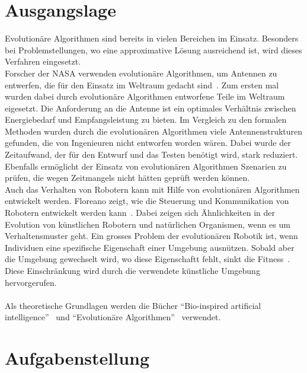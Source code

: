   \section{Ausgangslage}

    Evolutionäre Algorithmen sind bereits in vielen Bereichen im Einsatz.
    Besonders bei Problemstellungen, wo eine approximative Lösung ausreichend ist,
    wird dieses Verfahren eingesetzt.
    \\
    Forscher der NASA verwenden evolutionäre Algorithmen, um Antennen zu entwerfen,
    die für den Einsatz im Weltraum gedacht sind~\cite{Hornby2006}.
    Zum ersten mal wurden dabei durch evolutionäre Algorithmen entworfene Teile im Weltraum eigesetzt.
    Die Anforderung an die Antenne ist ein optimales Verhältnis zwischen Energiebedarf und Empfangsleistung zu bieten.
    Im Vergleich zu den formalen Methoden wurden durch die evolutionären Algorithmen viele Antennenstrukturen gefunden,
    die von Ingenieuren nicht entworfen worden wären.
    Dabei wurde der Zeitaufwand, der für den Entwurf und das Testen benötigt wird, stark reduziert.
    Ebenfalls ermöglicht der Einsatz von evolutionären Algorithmen Szenarien zu prüfen,
    die wegen Zeitmangels nicht hätten geprüft werden können.
    \\
    Auch das Verhalten von Robotern kann mit Hilfe von evolutionären Algorithmen entwickelt werden.
    Floreano zeigt, wie die Steuerung und Kommunikation von Robotern entwickelt werden kann~\cite{Floreano2010}.
    Dabei zeigen sich Ähnlichkeiten in der Evolution von künstlichen Robotern und natürlichen Organismen,
    wenn es um Verhaltensmuster geht.
    Ein grosses Problem der evolutionären Robotik ist,
    wenn Individuen eine spezifische Eigenschaft einer Umgebung ausnützen.
    Sobald aber die Umgebung gewechselt wird, wo diese Eigenschaftt fehlt, sinkt die Fitness~\cite[S.6]{Floreano2010}.
    Diese Einschränkung wird durch die verwendete künstliche Umgebung hervorgerufen.
    \\
    \\
    Als theoretische Grundlagen werden die Bücher ``Bio-inspired artificial intelligence''~\cite{book:bioInspired} und
    ``Evolutionäre Algorithmen''~\cite{book:evAlgo} verwendet.

  \section{Aufgabenstellung}

